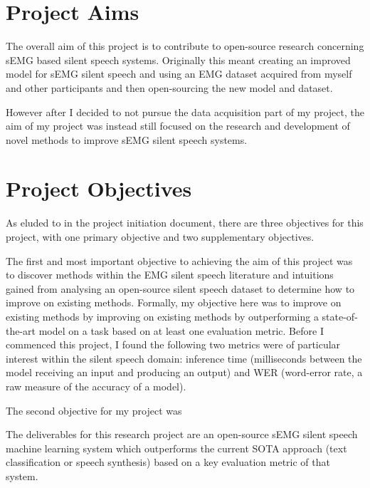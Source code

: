 \section{Project Aims}

The overall aim of this project is to contribute to open-source research concerning
sEMG based silent speech systems. Originally this meant creating an improved model
for sEMG silent speech and using an EMG dataset acquired from myself and other
participants and then open-sourcing the new model and dataset.

However after I decided to not pursue the data acquisition part of my project,
the aim of my project was instead still focused on the research and development
of novel methods to improve sEMG silent speech systems.

\section{Project Objectives}

As eluded to in the project initiation document, there are three objectives
for this project, with one primary objective and two supplementary objectives.

The first and most important objective to achieving the aim of this project
was to discover methods within the EMG silent speech literature and intuitions
gained from analysing an open-source silent speech dataset to determine how
to improve on existing methods.
Formally, my objective here was to improve on existing methods by improving
on existing methods by outperforming a state-of-the-art model on a task
based on at least one evaluation metric. Before I commenced this project,
I found the following two metrics were of particular interest within the
silent speech domain: inference time (milliseconds between the model
receiving an input and producing an output) and WER (word-error rate,
a raw measure of the accuracy of a model).

The second objective for my project was

The deliverables for this research project are an open-source
sEMG silent speech machine learning system which outperforms the current
SOTA approach (text classification or speech synthesis) based on a key
evaluation metric of that system.